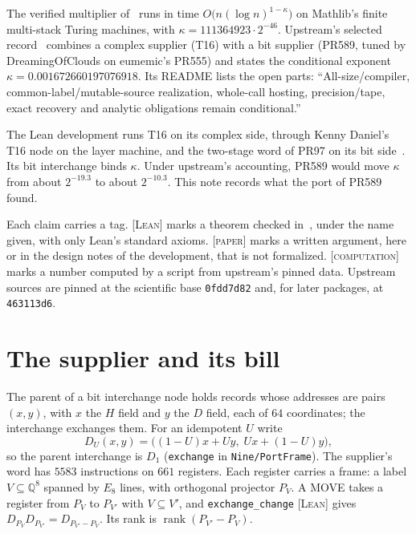 \documentclass[11pt]{amsart}
\newcommand{\Q}{\mathbb{Q}}
\newcommand{\lean}[1]{\texttt{#1}}
\newcommand{\tagL}{\textsc{[Lean]}}
\newcommand{\tagP}{\textsc{[paper]}}
\newcommand{\tagC}{\textsc{[computation]}}
\begin{document}
The verified multiplier of~\cite{IMB} runs in time $O\bigl(n(\log n)^{1-\kappa}\bigr)$ on Mathlib's
finite multi-stack Turing machines, with $\kappa = 111364923 \cdot 2^{-46}$. Upstream's selected record~\cite{CS} combines a complex
supplier (T16) with a bit supplier (PR589, tuned by DreamingOfClouds on eumemic's PR555) and states
the conditional exponent $\kappa = 0.001672660197076918$. Its README lists the open parts: ``All-size/compiler,
common-label/mutable-source realization, whole-call hosting, precision/tape, exact recovery and
analytic obligations remain conditional.''

The Lean development runs T16 on its complex side, through Kenny Daniel's T16 node on the layer
machine, and the two-stage word of PR97 on its bit side~\cite{P97}. Its bit interchange binds
$\kappa$. Under upstream's accounting, PR589 would move $\kappa$ from about $2^{-19.3}$ to about
$2^{-10.3}$. This note records what the
port of PR589 found.

Each claim carries a tag. \tagL{} marks a theorem checked in~\cite{IMB}, under the name given, with
only Lean's standard axioms. \tagP{} marks a written argument, here or in the design notes of the
development, that is not formalized. \tagC{} marks a number computed by a script from upstream's
pinned data. Upstream sources are pinned at the scientific base \texttt{0fdd7d82} and, for later
packages, at \texttt{463113d6}.

\section{The supplier and its bill}

The parent of a bit interchange node holds records whose addresses are pairs $(x,y)$, with $x$ the
$H$ field and $y$ the $D$ field, each of $64$ coordinates; the interchange exchanges them. For an
idempotent $U$ write
\[
  D_U(x, y) = \bigl((1-U)x + Uy,\; Ux + (1-U)y\bigr),
\]
so the parent interchange is $D_1$ (\lean{exchange} in \lean{Nine/PortFrame}). The supplier's word
has $5583$ instructions on $661$ registers. Each register carries a frame: a label $V \subseteq
\Q^8$ spanned by $E_8$ lines, with orthogonal projector $P_V$. A MOVE takes a register from $P_V$ to
$P_{V'}$ with $V \subseteq V'$, and \lean{exchange\_change} \tagL{} gives
$D_{P_V} D_{P_{V'}} = D_{P_{V'} - P_V}$. Its rank is $\operatorname{rank}(P_{V'} - P_V)$.
\end{document}
